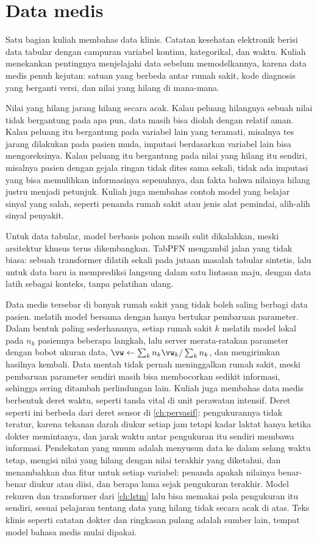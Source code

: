\section{Data medis}

Satu bagian kuliah membahas data klinis. Catatan kesehatan elektronik berisi data tabular dengan campuran variabel
kontinu, kategorikal, dan waktu. Kuliah menekankan pentingnya menjelajahi data sebelum memodelkannya, karena data medis
penuh kejutan: satuan yang berbeda antar rumah sakit, kode diagnosis yang berganti versi, dan nilai yang hilang di
mana-mana.

Nilai yang hilang jarang hilang secara acak. Kalau peluang hilangnya sebuah nilai tidak bergantung pada apa pun, data
masih bisa diolah dengan relatif aman. Kalau peluang itu bergantung pada variabel lain yang teramati, misalnya tes jarang
dilakukan pada pasien muda, imputasi berdasarkan variabel lain bisa mengoreksinya. Kalau peluang itu bergantung pada nilai
yang hilang itu sendiri, misalnya pasien dengan gejala ringan tidak dites sama sekali, tidak ada imputasi yang bisa
memulihkan informasinya sepenuhnya, dan fakta bahwa nilainya hilang justru menjadi petunjuk. Kuliah juga membahas contoh
model yang belajar sinyal yang salah, seperti penanda rumah sakit atau jenis alat pemindai, alih-alih sinyal penyakit.

Untuk data tabular, model berbasis pohon masih sulit dikalahkan, meski arsitektur khusus terus dikembangkan. TabPFN
\citep{hollmann2025} mengambil jalan yang tidak biasa: sebuah transformer dilatih sekali pada jutaan masalah tabular
sintetis, lalu untuk data baru ia memprediksi langsung dalam satu lintasan maju, dengan data latih sebagai konteks, tanpa
pelatihan ulang.

Data medis tersebar di banyak rumah sakit yang tidak boleh saling berbagi data pasien.  melatih
model bersama dengan hanya bertukar pembaruan parameter. Dalam bentuk paling sederhananya, setiap rumah sakit $k$ melatih
model lokal pada $n_k$ pasiennya beberapa langkah, lalu server merata-ratakan parameter dengan bobot ukuran data,
$\vw\leftarrow\sum_kn_k\vw_k/\sum_kn_k$, dan mengirimkan hasilnya kembali. Data mentah tidak pernah meninggalkan rumah sakit,
meski pembaruan parameter sendiri masih bisa membocorkan sedikit informasi, sehingga sering ditambah perlindungan lain.
Kuliah juga membahas data medis berbentuk deret waktu, seperti tanda vital di unit perawatan intensif. Deret seperti ini berbeda
dari deret sensor di \cref{ch:pervasif}: pengukurannya tidak teratur, karena tekanan darah diukur setiap jam tetapi kadar laktat hanya
ketika dokter memintanya, dan jarak waktu antar pengukuran itu sendiri membawa informasi. Pendekatan yang umum adalah menyusun data ke
dalam selang waktu tetap, mengisi nilai yang hilang dengan nilai terakhir yang diketahui, dan menambahkan dua fitur untuk setiap
variabel: penanda apakah nilainya benar-benar diukur atau diisi, dan berapa lama sejak pengukuran terakhir. Model rekuren dan
transformer dari \cref{ch:lstm} lalu bisa memakai pola pengukuran itu sendiri, sesuai pelajaran tentang data yang hilang tidak secara
acak di atas. Teks klinis seperti catatan dokter dan ringkasan pulang adalah sumber lain, tempat model bahasa medis mulai dipakai.

